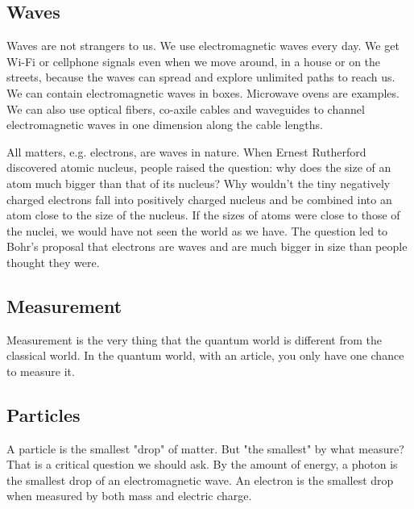 \documentclass{book}
\begin{document}
\subsection{Waves}
Waves are not strangers to us. We use electromagnetic waves every day. We get Wi-Fi or cellphone signals even when we move around, in a house or on the streets, because the waves can spread and explore unlimited paths to reach us. We can contain electromagnetic waves in boxes. Microwave ovens are examples. We can also use optical fibers, co-axile cables and waveguides to channel electromagnetic waves in one dimension along the cable lengths.

All matters, e.g. electrons, are waves in nature. When Ernest Rutherford discovered atomic nucleus, people raised the question: why does the size of an atom much bigger than that of its nucleus? Why wouldn't the tiny negatively charged electrons fall into positively charged nucleus and be combined into an atom close to the size of the nucleus. If the sizes of atoms were close to those of the nuclei, we would have not seen the world as we have. The question led to Bohr's proposal that electrons are waves and are much bigger in size than people thought they were.

\subsection{Measurement}
Measurement is the very thing that the quantum world is different from the classical world. In the quantum world, with an article, you only have one chance to measure it. 

\subsection{Particles}
A particle is the smallest "drop" of matter. But "the smallest" by what measure? That is a critical question we should ask. By the amount of energy, a photon is the smallest drop of an electromagnetic wave. An electron is the smallest drop when measured by both mass and electric charge.
\end{document}

